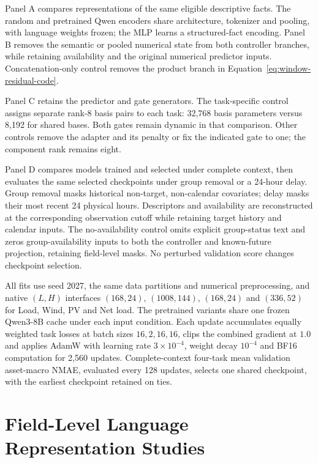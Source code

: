 \documentclass[journal]{IEEEtran}
\begin{document}
Panel A compares representations of the same eligible descriptive facts. The random and pretrained Qwen encoders share architecture, tokenizer and pooling, with language weights frozen; the MLP learns a structured-fact encoding. Panel B removes the semantic or pooled numerical state from both controller branches, while retaining availability and the original numerical predictor inputs. Concatenation-only control removes the product branch in Equation~\eqref{eq:window-residual-code}.

Panel C retains the predictor and gate generators. The task-specific control assigns separate rank-8 basis pairs to each task: 32,768 basis parameters versus 8,192 for shared bases. Both gates remain dynamic in that comparison. Other controls remove the adapter and its penalty or fix the indicated gate to one; the component rank remains eight.

Panel D compares models trained and selected under complete context, then evaluates the same selected checkpoints under group removal or a 24-hour delay. Group removal masks historical non-target, non-calendar covariates; delay masks their most recent 24 physical hours. Descriptors and availability are reconstructed at the corresponding observation cutoff while retaining target history and calendar inputs. The no-availability control omits explicit group-status text and zeros group-availability inputs to both the controller and known-future projection, retaining field-level masks. No perturbed validation score changes checkpoint selection.

All fits use seed 2027, the same data partitions and numerical preprocessing, and native $(L,H)$ interfaces $(168,24)$, $(1008,144)$, $(168,24)$ and $(336,52)$ for Load, Wind, PV and Net load. The pretrained variants share one frozen Qwen3-8B cache under each input condition. Each update accumulates equally weighted task losses at batch sizes $16,2,16,16$, clips the combined gradient at $1.0$ and applies AdamW with learning rate $3\times10^{-4}$, weight decay $10^{-4}$ and BF16 computation for 2,560 updates. Complete-context four-task mean validation asset-macro NMAE, evaluated every 128 updates, selects one shared checkpoint, with the earliest checkpoint retained on ties.

\section{Field-Level Language Representation Studies}
\label{sec:language_studies}
\end{document}
